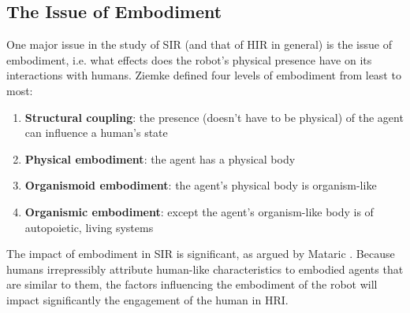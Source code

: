\documentclass{ut-thesis}
\begin{document}
\subsection{The Issue of Embodiment}
One major issue in the study of SIR (and that of HIR in general) is the issue of embodiment, i.e. what effects does the robot's physical presence have on its interactions with humans.  Ziemke \cite{ziemke2001disentangling} defined four levels of embodiment from least to most:
\begin{enumerate}
	\item \textbf{Structural coupling}: the presence (doesn't have to be physical) of the agent can influence a human's state
	\item \textbf{Physical embodiment}: the agent has a physical body
	\item \textbf{Organismoid embodiment}: the agent's physical body is organism-like
	\item \textbf{Organismic embodiment}: except the agent's organism-like body is of autopoietic, living systems
\end{enumerate}


The impact of embodiment in SIR is significant, as argued by Mataric \cite{mataric2005role}.  Because humans irrepressibly attribute human-like characteristics to embodied agents that are similar to them, the factors influencing the embodiment of the robot will impact significantly the engagement of the human in HRI.
\end{document}
